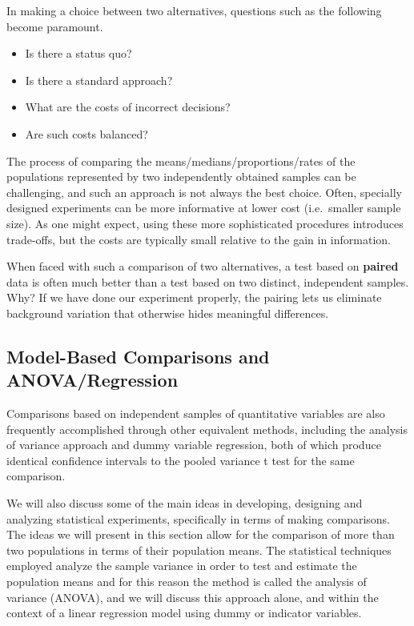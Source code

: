\documentclass[
]{book}
\providecommand{\tightlist}{%
  \setlength{\itemsep}{0pt}\setlength{\parskip}{0pt}}
\begin{document}
In making a choice between two alternatives, questions such as the following become paramount.

\begin{itemize}
\tightlist
\item
  Is there a status quo?
\item
  Is there a standard approach?
\item
  What are the costs of incorrect decisions?
\item
  Are such costs balanced?
\end{itemize}

The process of comparing the means/medians/proportions/rates of the populations represented by two independently obtained samples can be challenging, and such an approach is not always the best choice. Often, specially designed experiments can be more informative at lower cost (i.e.~smaller sample size). As one might expect, using these more sophisticated procedures introduces trade-offs, but the costs are typically small relative to the gain in information.

When faced with such a comparison of two alternatives, a test based on \textbf{paired} data is often much better than a test based on two distinct, independent samples. Why? If we have done our experiment properly, the pairing lets us eliminate background variation that otherwise hides meaningful differences.

\hypertarget{model-based-comparisons-and-anovaregression}{%
\subsection{Model-Based Comparisons and ANOVA/Regression}\label{model-based-comparisons-and-anovaregression}}

Comparisons based on independent samples of quantitative variables are also frequently accomplished through other equivalent methods, including the analysis of variance approach and dummy variable regression, both of which produce identical confidence intervals to the pooled variance t test for the same comparison.

We will also discuss some of the main ideas in developing, designing and analyzing statistical experiments, specifically in terms of making comparisons. The ideas we will present in this section allow for the comparison of more than two populations in terms of their population means. The statistical techniques employed analyze the sample variance in order to test and estimate the population means and for this reason the method is called the analysis of variance (ANOVA), and we will discuss this approach alone, and within the context of a linear regression model using dummy or indicator variables.
\end{document}

